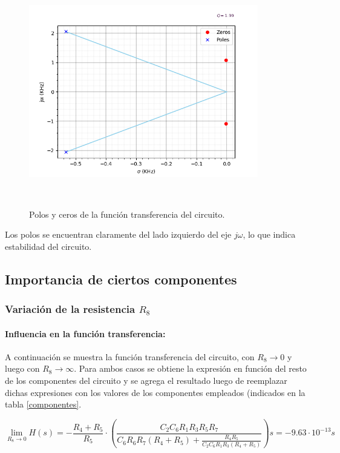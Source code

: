 \begin{figure}[H] %
	\centering
	\includegraphics[width=10cm,height=10cm,keepaspectratio]{../EJ1/00GRAFICOS/singularidades.png}
	\caption{Polos y ceros de la funci\'on transferencia del circuito.}
	\label{c1vinmax}
\end{figure}

Los polos se encuentran claramente del lado izquierdo del eje $j\omega$, lo que indica estabilidad del circuito.


\subsection{Importancia de ciertos componentes}
\subsubsection{Variaci\'on de la resistencia $R_8$}

\paragraph*{Influencia en la funci\'on transferencia:} A continuaci\'on se muestra la funci\'on transferencia del circuito, con $R_8\to 0$ y luego con $R_8\to \infty$. Para ambos casos se obtiene la expresi\'on en funci\'on del resto de los componentes del circuito y se agrega el resultado luego de reemplazar dichas expresiones con los valores de los componentes empleados (indicados en la tabla \ref{componentes}.

\begin{equation}
\lim_{R_8\to 0} H(s) = - \frac{R_4 + R_5}{R_5} \cdot 
\left(\frac{C_2 C_6 R_1 R_3 R_5 R_7}{C_6 R_6 R_7(R_4 + R_5)+\frac{R_4 R_5}{C_2 C_6 R_1 R_3 (R_4+R_5)}}\right)s = - 9.63 \cdot 10^{-13} s
\end{equation}

